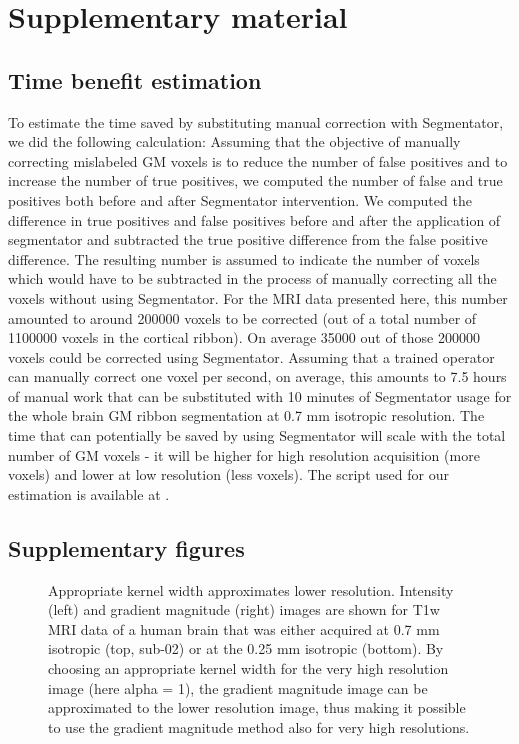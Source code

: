 \clearpage
\section{Supplementary material}
\subsection{Time benefit estimation}
\label{S1_Appendix}
To estimate the time saved by substituting manual correction with Segmentator, we did the following calculation: Assuming that the objective of manually correcting mislabeled GM voxels is to reduce the number of false positives and to increase the number of true positives, we computed the number of false and true positives both before and after Segmentator intervention. We computed the difference in true positives and false positives before and after the application of segmentator and subtracted the true positive difference from the false positive difference. The resulting number is assumed to indicate the number of voxels which would have to be subtracted in the process of manually correcting all the voxels without using Segmentator. For the MRI data presented here, this number amounted to around 200000 voxels to be corrected (out of a total number of 1100000 voxels in the cortical ribbon). On average 35000 out of those 200000 voxels could be corrected using Segmentator. Assuming that a trained operator can manually correct one voxel per second, on average, this amounts to 7.5 hours of manual work that can be substituted with 10 minutes of Segmentator usage for the whole brain GM ribbon segmentation at 0.7 mm isotropic resolution. The time that can potentially be saved by using Segmentator will scale with the total number of GM voxels - it will be higher for high resolution acquisition (more voxels) and lower at low resolution (less voxels). The script used for our estimation is available at \cite{segmentator_processing_scripts}.

\clearpage
\subsection{Supplementary figures}
\beginsupplement

\begin{figure}[htbp!]
\centering
\caption{Appropriate kernel width approximates lower resolution. Intensity (left) and gradient magnitude (right) images are shown for T1w MRI data of a human brain that was either acquired at 0.7 mm isotropic (top, sub-02) or at the 0.25 mm isotropic \parencite{Lusebrink2017, 250micron_data} (bottom). By choosing an appropriate kernel width for the very high resolution image (here alpha = 1), the gradient magnitude image can be approximated to the lower resolution image, thus making it possible to use the gradient magnitude method also for very high resolutions.}
\label{S1_Fig}
\end{figure}

